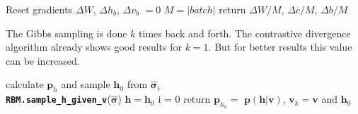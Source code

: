 \documentclass[submission, Phys]{SciPost}
\begin{document}
\begin{algorithm}[H]
	 \caption{Compute Gradient from Batch. \textbf{\lstinline{RBM.compute_batch_gradients}}(k, batch) }
  \SetAlgoLined
  Reset gradients $\Delta W$, $\Delta h_b$, $\Delta v_b$ $= 0$\;
 $M = \vert batch \vert$ \;
 return $\Delta W / M$,  $\Delta c / M$, $\Delta b / M$
\end{algorithm}


The Gibbs sampling is done $k$ times back and forth. The contrastive divergence algorithm already shows good results for $k=1$. But for better results this value can be increased.

\begin{algorithm}[H]
	 \caption{Gibbs sampling. \textbf{\lstinline{RBM.gibbs_sampling}}(k, $\hat{ \boldsymbol{ \sigma}}_i$) }
  \SetAlgoLined
  calculate $\bm{p}_h$ and sample $\bm{h}_0$ from $\hat{ \boldsymbol{ \sigma}}_i$\\
  \textbf{\lstinline{RBM.sample_h_given_v}}($\hat{ \boldsymbol{ \sigma}}$)   
  $\bm{h} = \bm{h}_0$\;
  i = 0\;
  return $\bm{p}_{h_k} =$  $\bm{p}(\bm{h}|\bm{v})$, $\bm{v}_k = \bm{v}$ and $\bm{h}_0$\;
 
\end{algorithm}


\end{document}
